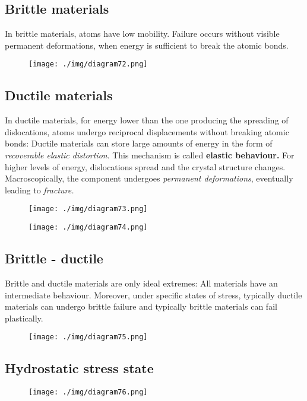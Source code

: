 \subsection{Brittle materials}
In brittle materials, atoms have low mobility. Failure occurs without visible permanent deformations, when energy is sufficient to break the atomic bonds.
\begin{figure}[H]
  \centering
  \texttt{[image: ./img/diagram72.png]}
  \caption{}
\end{figure}
\subsection{Ductile materials}
In ductile materials, for energy lower than the one producing the spreading of dislocations, atoms undergo reciprocal displacements without breaking atomic bonds: Ductile materials can store large amounts of energy in the form of \textit{recoverable elastic distortion}. This mechanism is called \textbf{elastic behaviour.} For higher levels of energy, dislocations spread and the crystal structure changes. Macroscopically, the component undergoes \textit{permanent deformations}, eventually leading to \textit{fracture.}
\begin{figure}
  \begin{center}
    \begin{minipage}[b]{0.46\textwidth}
      \centering
      \texttt{[image: ./img/diagram73.png]}
      \caption{}
    \end{minipage}
    \begin{minipage}[b]{0.46\textwidth}
      \centering
      \texttt{[image: ./img/diagram74.png]}
      \caption{}
    \end{minipage}
  \end{center}
\end{figure}
\subsection{Brittle - ductile}
Brittle and ductile materials are only ideal extremes: All materials have an intermediate behaviour. Moreover, under specific states of stress, typically ductile materials can undergo brittle failure and typically brittle materials can fail plastically.
\begin{figure}[H]
  \centering
  \texttt{[image: ./img/diagram75.png]}
  \caption{}
\end{figure}
\subsection{Hydrostatic stress state}
\begin{figure}[H]
  \centering
  \texttt{[image: ./img/diagram76.png]}
  \caption{}
\end{figure}
